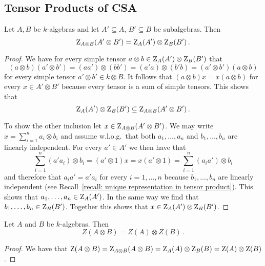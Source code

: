 \subsection{Tensor Products of CSA}


\begin{lemma}
  \label{lemma: centralizer componentwise}
  Let $A, B$ be $k$-algebras and let $A' \subseteq A$, $B' \subseteq B$ be subalgebras.
  Then
  \[
      \operatorname{Z}_{A \otimes B}(A' \otimes B')
    = \operatorname{Z}_A(A') \otimes \operatorname{Z}_B(B') \,.
  \]
\end{lemma}


\begin{proof}
  We have for every simple tensor $a \otimes b \in \operatorname{Z}_A(A') \otimes \operatorname{Z}_B(B')$ that
  \[
      (a \otimes b) (a' \otimes b')
    = (aa') \otimes (bb')
    = (a'a) \otimes (b'b)
    = (a' \otimes b')(a \otimes b)
  \]
  for every simple tensor $a' \otimes b' \in k \otimes B$.
  It follows that $(a \otimes b) x = x (a \otimes b)$ for every $x \in A' \otimes B'$ because every tensor is a sum of simple tensors.
  This shows that
  \[
              \operatorname{Z}_A(A') \otimes \operatorname{Z}_B(B')
    \subseteq \operatorname{Z}_{A \otimes B}(A' \otimes B') \,.
  \]
  
  To show the other inclusion let $x \in \operatorname{Z}_{A \otimes B}(A' \otimes B')$.
  We may write $x = \sum_{i=1}^n a_i \otimes b_i$ and assume w.l.o.g.\ that both $a_1, \dotsc, a_n$ and $b_1, \dotsc, b_n$ are linearly independent.
  For every $a' \in A'$ we then have that
  \[
      \sum_{i=1}^n (a' a_i) \otimes b_i
    = (a' \otimes 1) x
    = x (a' \otimes 1)
    = \sum_{i=1}^n (a_i a') \otimes b_i
  \]
  and therefore that $a_i a' = a' a_i$ for every $i = 1, \dotsc, n$ because $b_1, \dotsc, b_n$ are linearly independent (see Recall~\ref{recall: unique representation in tensor product}).
  This shows that $a_1, \dotsc, a_n \in \operatorname{Z}_{A}(A')$.
  In the same way we find that $b_1, \dotsc, b_n \in \operatorname{Z}_{B}(B')$.
  Together this shows that $x \in \operatorname{Z}_A(A') \otimes \operatorname{Z}_B(B')$.
\end{proof}


\begin{corollary}
  \label{corollary: center of tensor product}
  Let $A$ and $B$ be $k$-algebras.
  Then
  \[
      Z(A \otimes B)
    = Z(A) \otimes Z(B) \,.
  \]
\end{corollary}


\begin{proof}
  We have that
  $
      \operatorname{Z}(A \otimes B)
    = \operatorname{Z}_{A \otimes B}(A \otimes B)
    = \operatorname{Z}_A(A) \otimes \operatorname{Z}_B(B)
    = \operatorname{Z}(A) \otimes \operatorname{Z}(B)
  $.
\end{proof}


